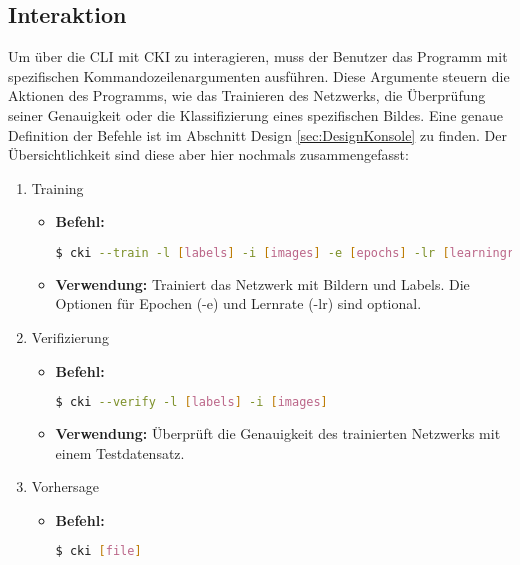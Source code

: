 \subsection{Interaktion}
\label{sec:UsageInteraktion}
Um über die CLI mit CKI zu interagieren, muss der Benutzer das Programm mit spezifischen Kommandozeilenargumenten ausführen. Diese Argumente steuern die Aktionen des Programms, wie das Trainieren des Netzwerks, die Überprüfung seiner Genauigkeit oder die Klassifizierung eines spezifischen Bildes.  Eine genaue Definition der Befehle ist im Abschnitt Design \ref{sec:DesignKonsole} zu finden.
Der Übersichtlichkeit sind diese aber hier nochmals zusammengefasst:
\begin{enumerate}
	\item Training
				\begin{itemize}
					\item \textbf{Befehl:} 
								\begin{lstlisting}[language=bash]
$ cki --train -l [labels] -i [images] -e [epochs] -lr [learningrate]
								\end{lstlisting}
					\item \textbf{Verwendung:} Trainiert das Netzwerk mit Bildern und Labels. Die Optionen für Epochen (-e) und Lernrate (-lr) sind optional.
				\end{itemize}
	\item Verifizierung
				\begin{itemize}
					\item \textbf{Befehl:}
								\begin{lstlisting}[language=bash]
$ cki --verify -l [labels] -i [images]
								\end{lstlisting}
					\item \textbf{Verwendung:} Überprüft die Genauigkeit des trainierten Netzwerks mit einem Testdatensatz.
				\end{itemize}
	\item Vorhersage
				\begin{itemize}
					\item \textbf{Befehl:}
								\begin{lstlisting}[language=bash]
$ cki [file]
								\end{lstlisting}

\end{itemize}
\end{enumerate}
